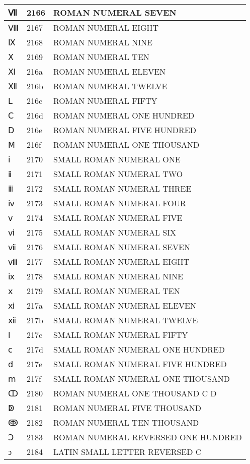 \documentclass[12pt,letterpaper,openany]{book}
\begin{document}
\begin{center}
\begin{supertabular}{|m{0.25in}|m{0.5in}|m{4in}|}
Ⅶ & 2166 & ROMAN NUMERAL SEVEN\\\hline
Ⅷ & 2167 & ROMAN NUMERAL EIGHT\\\hline
Ⅸ & 2168 & ROMAN NUMERAL NINE\\\hline
Ⅹ & 2169 & ROMAN NUMERAL TEN\\\hline
Ⅺ & 216a & ROMAN NUMERAL ELEVEN\\\hline
Ⅻ & 216b & ROMAN NUMERAL TWELVE\\\hline
Ⅼ & 216c & ROMAN NUMERAL FIFTY\\\hline
Ⅽ & 216d & ROMAN NUMERAL ONE HUNDRED\\\hline
Ⅾ & 216e & ROMAN NUMERAL FIVE HUNDRED\\\hline
Ⅿ & 216f & ROMAN NUMERAL ONE THOUSAND\\\hline
ⅰ & 2170 & SMALL ROMAN NUMERAL ONE\\\hline
ⅱ & 2171 & SMALL ROMAN NUMERAL TWO\\\hline
ⅲ & 2172 & SMALL ROMAN NUMERAL THREE\\\hline
ⅳ & 2173 & SMALL ROMAN NUMERAL FOUR\\\hline
ⅴ & 2174 & SMALL ROMAN NUMERAL FIVE\\\hline
ⅵ & 2175 & SMALL ROMAN NUMERAL SIX\\\hline
ⅶ & 2176 & SMALL ROMAN NUMERAL SEVEN\\\hline
ⅷ & 2177 & SMALL ROMAN NUMERAL EIGHT\\\hline
ⅸ & 2178 & SMALL ROMAN NUMERAL NINE\\\hline
ⅹ & 2179 & SMALL ROMAN NUMERAL TEN\\\hline
ⅺ & 217a & SMALL ROMAN NUMERAL ELEVEN\\\hline
ⅻ & 217b & SMALL ROMAN NUMERAL TWELVE\\\hline
ⅼ & 217c & SMALL ROMAN NUMERAL FIFTY\\\hline
ⅽ & 217d & SMALL ROMAN NUMERAL ONE HUNDRED\\\hline
ⅾ & 217e & SMALL ROMAN NUMERAL FIVE HUNDRED\\\hline
ⅿ & 217f & SMALL ROMAN NUMERAL ONE THOUSAND\\\hline
ↀ & 2180 & ROMAN NUMERAL ONE THOUSAND C D\\\hline
ↁ & 2181 & ROMAN NUMERAL FIVE THOUSAND\\\hline
ↂ & 2182 & ROMAN NUMERAL TEN THOUSAND\\\hline
Ↄ & 2183 & ROMAN NUMERAL REVERSED ONE HUNDRED\\\hline
ↄ & 2184 & LATIN SMALL LETTER REVERSED C\\\hline

\end{supertabular}
\end{center}
\end{document}
